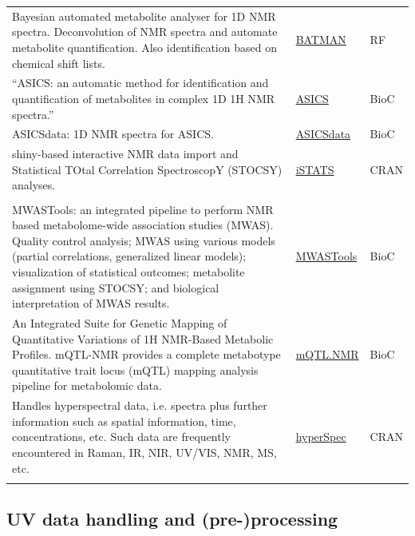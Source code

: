 \documentclass[]{article}
\begin{document}
\begin{longtable}[t]{>{\raggedright\arraybackslash}p{30em}>{\raggedright\arraybackslash}p{10em}>{\raggedright\arraybackslash}p{3em}}
\rowcolor{gray!6}  Bayesian automated metabolite analyser for 1D NMR spectra. Deconvolution of NMR spectra and automate metabolite quantification. Also identification based on chemical shift lists. & \href{http://batman.r-forge.r-project.org/}{BATMAN} & RF\\
“ASICS: an automatic method for identification and quantification of metabolites in complex 1D 1H NMR spectra.” & \href{https://bioconductor.org/packages/release/bioc/html/ASICS.html}{ASICS} & BioC\\
\rowcolor{gray!6}  ASICSdata: 1D NMR spectra for ASICS. & \href{https://www.bioconductor.org/packages/release/data/experiment/vignettes/ASICSdata/inst/doc/ASICSdata.html}{ASICSdata} & BioC\\
shiny-based interactive NMR data import and Statistical TOtal Correlation SpectroscopY (STOCSY) analyses. & \href{https://cran.r-project.org/package=iSTATS}{iSTATS} & CRAN\\
\rowcolor{gray!6}  \addlinespace[0.3em]
\multicolumn{3}{l}{\textbf{NMR and integration with Genomics}}\\
MWASTools: an integrated pipeline to perform NMR based metabolome-wide association studies (MWAS). Quality control analysis; MWAS using various models (partial correlations, generalized linear models); visualization of statistical outcomes; metabolite assignment using STOCSY; and biological interpretation of MWAS results. & \href{https://bioconductor.org/packages/release/bioc/html/MWASTools.html}{MWASTools} & BioC\\
An Integrated Suite for Genetic Mapping of Quantitative Variations of 1H NMR-Based Metabolic Profiles. mQTL-NMR provides a complete metabotype quantitative trait locus (mQTL) mapping analysis pipeline for metabolomic data. & \href{https://doi.org/doi:10.18129/B9.bioc.mQTL.NMR}{mQTL.NMR} & BioC\\
\rowcolor{gray!6}  Handles hyperspectral data, i.e. spectra plus further information such as spatial information, time, concentrations, etc. Such data are frequently encountered in Raman, IR, NIR, UV/VIS, NMR, MS, etc. & \href{https://cran.r-project.org/package=ChemoSpec}{hyperSpec} & CRAN\\*
\end{longtable}

\newpage

\hypertarget{uv-data-handling-and-pre-processing}{%
\subsection{UV data handling and (pre-)processing}\label{uv-data-handling-and-pre-processing}}
\end{document}
